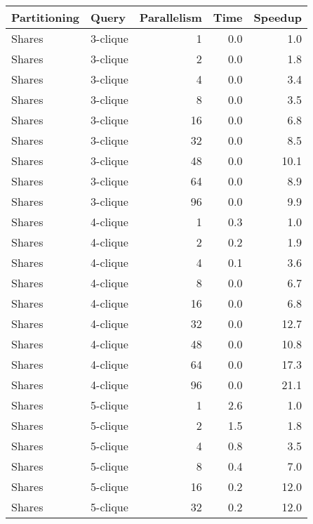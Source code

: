 \begin{tabular}{llr|rr}
\toprule
  Partitioning &     Query &  Parallelism &  Time &  Speedup \\
\midrule
        Shares &  3-clique &            1 &   0.0 &      1.0 \\
        Shares &  3-clique &            2 &   0.0 &      1.8 \\
        Shares &  3-clique &            4 &   0.0 &      3.4 \\
        Shares &  3-clique &            8 &   0.0 &      3.5 \\
        Shares &  3-clique &           16 &   0.0 &      6.8 \\
        Shares &  3-clique &           32 &   0.0 &      8.5 \\
        Shares &  3-clique &           48 &   0.0 &     10.1 \\
        Shares &  3-clique &           64 &   0.0 &      8.9 \\
        Shares &  3-clique &           96 &   0.0 &      9.9 \\
        Shares &  4-clique &            1 &   0.3 &      1.0 \\
        Shares &  4-clique &            2 &   0.2 &      1.9 \\
        Shares &  4-clique &            4 &   0.1 &      3.6 \\
        Shares &  4-clique &            8 &   0.0 &      6.7 \\
        Shares &  4-clique &           16 &   0.0 &      6.8 \\
        Shares &  4-clique &           32 &   0.0 &     12.7 \\
        Shares &  4-clique &           48 &   0.0 &     10.8 \\
        Shares &  4-clique &           64 &   0.0 &     17.3 \\
        Shares &  4-clique &           96 &   0.0 &     21.1 \\
        Shares &  5-clique &            1 &   2.6 &      1.0 \\
        Shares &  5-clique &            2 &   1.5 &      1.8 \\
        Shares &  5-clique &            4 &   0.8 &      3.5 \\
        Shares &  5-clique &            8 &   0.4 &      7.0 \\
        Shares &  5-clique &           16 &   0.2 &     12.0 \\
        Shares &  5-clique &           32 &   0.2 &     12.0 \\

\end{tabular}
